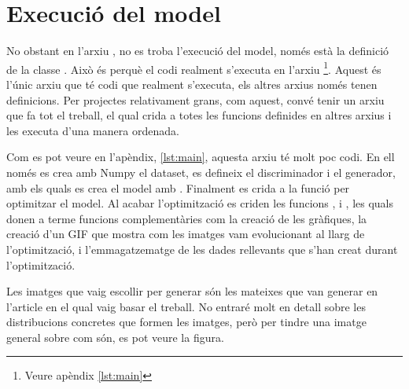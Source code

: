 \section{Execució del model}

No obstant en l'arxiu , no es troba l'execució del model, només està la definició de la classe . Això és perquè el codi realment s'executa en l'arxiu \footnote{Veure apèndix \ref{lst:main}}. Aquest és l'únic arxiu que té codi que realment s'executa, els altres arxius només tenen definicions. Per projectes relativament grans, com aquest, convé tenir un arxiu que fa tot el treball, el qual crida a totes les funcions definides en altres arxius i les executa d'una manera ordenada. 

Com es pot veure en l'apèndix, \ref{lst:main}, aquesta arxiu té molt poc codi. En ell només es crea amb Numpy el dataset, es defineix el discriminador i el generador, amb els quals es crea el model amb . Finalment es crida a la funció  per optimitzar el model. Al acabar l'optimització es criden les funcions ,  i , les quals donen a terme funcions complementàries com la creació de les gràfiques, la creació d'un GIF que mostra com les imatges vam evolucionant al llarg de l'optimització, i l'emmagatzematge de les dades rellevants que s'han creat durant l'optimització.  

Les imatges que vaig escollir per generar són les mateixes que van generar en l'article en el qual vaig basar el treball. No entraré molt en detall sobre les distribucions concretes que formen les imatges, però per tindre una imatge general sobre com són, es pot veure la figura. 

